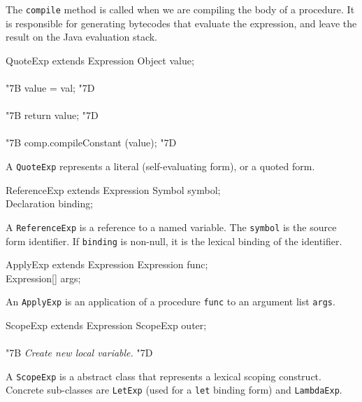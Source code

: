 \documentclass[twocolumn]{article}
\newcommand{\LBr}{\char"7B}
\newcommand{\RBr}{\char"7D}
\begin{document}
The {\tt compile} method is called when we are compiling
the body of a procedure.  It is responsible for generating bytecodes
that evaluate the expression, and leave the result on the Java
evaluation stack.

\begin{Class}{QuoteExp}{ extends Expression}
Object value;\\
\\
{\LBr} value = val; {\RBr}\\
\\
{\LBr} return value; {\RBr}\\
\\
{\LBr} comp.compileConstant (value); {\RBr}\\
\end{Class}

A {\tt QuoteExp} represents a literal (self-evaluating form),
or a quoted form.

\begin{Class}{ReferenceExp}{ extends Expression}
Symbol symbol;\\
Declaration binding;\\
\end{Class}

A {\tt ReferenceExp} is a reference to a named variable.
The {\tt symbol} is the source form identifier.
If {\tt binding} is non-null, it is the lexical
binding of the identifier.

\begin{Class}{ApplyExp}{ extends Expression}
Expression func;\\
Expression[] args;\\
\end{Class}

An {\tt ApplyExp} is an application of a procedure {\tt func}
to an argument list {\tt args}.

\begin{Class}{ScopeExp}{ extends Expression}
ScopeExp outer; \\
\\
{\LBr} {\it Create new local variable.} {\RBr}\\
\end{Class}

A {\tt ScopeExp} is a abstract class that represents a lexical
scoping construct.  Concrete sub-classes are {\tt LetExp}
(used for a {\tt let} binding form) and {\tt LambdaExp}.
\end{document}
